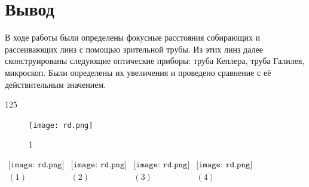 \section*{Вывод}
В ходе работы были определены фокусные расстояния собирающих и рассеивающих линз с помощью зрительной трубы. Из этих линз далее сконструированы следующие оптические приборы: труба Кеплера, труба Галилея, микроскоп. Были определены их увеличения и проведено сравнение с её действительным значением.




125





\lipsum[1-4]
\begin{figure}
\centering
\texttt{[image: rd.png]}
\caption{1}
\end{figure}
\lipsum[1-6]


\begin{center}
\begin{center}$
\begin{array}{cccc}
\texttt{[image: rd.png]}&
\texttt{[image: rd.png]}&
\texttt{[image: rd.png]}&
\texttt{[image: rd.png]}\\
(1) & (2) & (3) & (4)
\end{array}$
\end{center}
\end{center}

